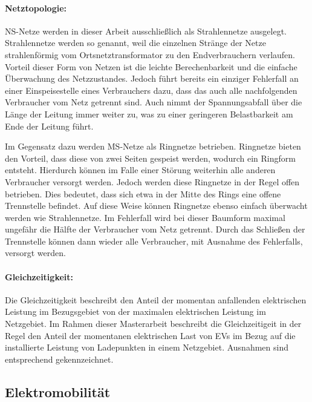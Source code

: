 


\paragraph{Netztopologie:}

\gls{NS}-Netze werden in dieser Arbeit ausschließlich als Strahlennetze ausgelegt.
Strahlennetze werden so genannt, weil die einzelnen Stränge der Netze strahlenförmig vom Ortsnetztransformator zu den Endverbrauchern verlaufen. \cite{Agora2019}
Vorteil dieser Form von Netzen ist die leichte Berechenbarkeit und die einfache Überwachung des Netzzustandes.
Jedoch führt bereits ein einziger Fehlerfall an einer Einspeisestelle eines Verbrauchers dazu, dass das auch alle nachfolgenden Verbraucher vom Netz getrennt sind.
Auch nimmt der Spannungsabfall über die Länge der Leitung immer weiter zu, was zu einer geringeren Belastbarkeit am Ende der Leitung führt. \cite{WNG2020}\medskip

Im Gegensatz dazu werden \gls{MS}-Netze als Ringnetze betrieben.
Ringnetze bieten den Vorteil, dass diese von zwei Seiten gespeist werden, wodurch ein Ringform entsteht.
Hierdurch können im Falle einer Störung weiterhin alle anderen Verbraucher versorgt werden.
Jedoch werden diese Ringnetze in der Regel offen betrieben.
Dies bedeutet, dass sich etwa in der Mitte des Rings eine offene Trennstelle befindet.
Auf diese Weise können Ringnetze ebenso einfach überwacht werden wie Strahlennetze.
Im Fehlerfall wird bei dieser Baumform maximal ungefähr die Hälfte der Verbraucher vom Netz getrennt.
Durch das Schließen der Trennstelle können dann wieder alle Verbraucher, mit Ausnahme des Fehlerfalls, versorgt werden. \cite{WNG2020} \cite{Westermann2019}

\paragraph{Gleichzeitigkeit:}

Die Gleichzeitigkeit beschreibt den Anteil der momentan anfallenden elektrischen Leistung im Bezugsgebiet von der maximalen elektrischen Leistung im Netzgebiet. \cite{Agora2019} 
Im Rahmen dieser Masterarbeit beschreibt die Gleichzeitigeit in der Regel den Anteil der momentanen elektrischen Last von \glspl{EV} im Bezug auf die installierte Leistung von Ladepunkten in einem Netzgebiet.
Ausnahmen sind entsprechend gekennzeichnet.


\subsection{Elektromobilität}

